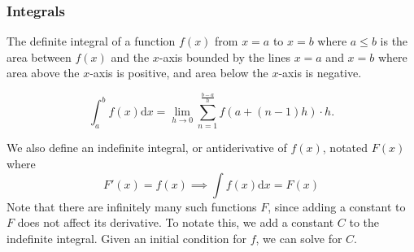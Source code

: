 \subsubsection{Integrals}
The definite integral of a function $f(x)$ from $x=a$ to $x=b$ where $a \leq b$ is the area between $f(x)$ and the $x$-axis bounded by the lines $x=a$ and $x=b$ where area above the $x$-axis is positive, and area below the $x$-axis is negative. 
\begin{definition}
	\begin{equation*}
		\int_{a}^{b}{f(x) \mathrm{d}x} = \lim\limits_{h \to 0}{\sum_{n=1}^{\frac{b-a}{h}}}{f(a + (n-1)h) \cdot h}.
	\end{equation*}
\end{definition}

\noindent
We also define an indefinite integral, or antiderivative of $f(x)$, notated $F(x)$ where
\begin{equation*}
F'(x) = f(x) \implies \int{f(x)\mathrm{d}x} = F(x)
\end{equation*}
Note that there are infinitely many such functions $F$, since adding a constant to $F$ does not affect its derivative. To notate this, we add a constant $C$ to the indefinite integral. Given an initial condition for $f$, we can solve for $C$.\\


